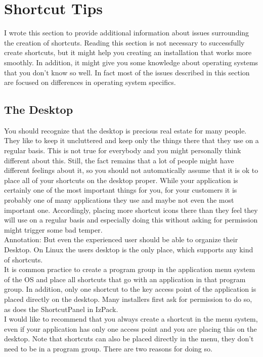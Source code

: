 \section{Shortcut Tips}

I wrote this section to provide additional information about issues
surrounding the creation of shortcuts. Reading this section is not
necessary to successfully create shortcuts, but it might help you
creating an installation that works more smoothly. In addition, it might
give you some knowledge about operating systems that you don't know so
well. In fact most of the issues described in this section are focused
on differences in operating system specifics.\\

\subsection{The Desktop}

You should recognize that the desktop is precious real estate for many
people. They like to keep it uncluttered and keep only the things there
that they use on a regular basis. This is not true for everybody and you
might personally think different about this. Still, the fact remains
that a lot of people might have different feelings about it, so you
should not automatically assume that it is ok to place all of your
shortcuts on the desktop proper. While your application is certainly one
of the most important things for you, for your customers it is probably
one of many applications they use and maybe not even the most important
one. Accordingly, placing more shortcut icons there than they feel they
will use on a regular basis and especially doing this without asking for
permission might trigger some bad temper.\\

Annotation: But even the experienced user should be able to organize their Desktop.
On Linux the users desktop is the only place, which supports any kind of shortcuts.\\

It is common practice to create a program group in the application menu
system of the OS and place all shortcuts that go with an application in
that program group. In addition, only one shortcut to the key access
point of the application is placed directly on the desktop. Many
installers first ask for permission to do so, as does the ShortcutPanel
in IzPack.\\

I would like to recommend that you always create a shortcut in the menu
system, even if your application has only one access point and you are
placing this on the desktop. Note that shortcuts can also be placed directly
in the menu, they don't need to be in a program group. There are two
reasons for doing so.\\

